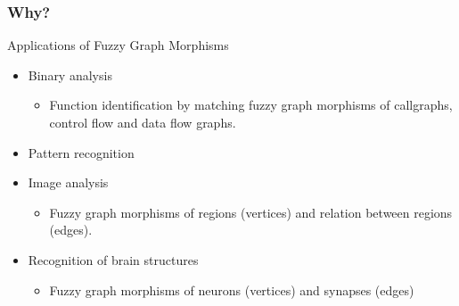 


\begin{frame}
	\frametitle{Why?}

	\begin{block}{Applications of Fuzzy Graph Morphisms}
		\begin{itemize}
			\item Binary analysis
			\begin{itemize}
				\item Function identification by matching fuzzy graph morphisms of callgraphs, control flow and data flow graphs.
			\end{itemize}
			\item Pattern recognition
			\item Image analysis
			\begin{itemize}
				\item Fuzzy graph morphisms of regions (vertices) and relation between regions (edges).
			\end{itemize}
			\item Recognition of brain structures
			\begin{itemize}
				\item Fuzzy graph morphisms of neurons (vertices) and synapses (edges)
			\end{itemize}
		\end{itemize}
	\end{block}
\end{frame}
